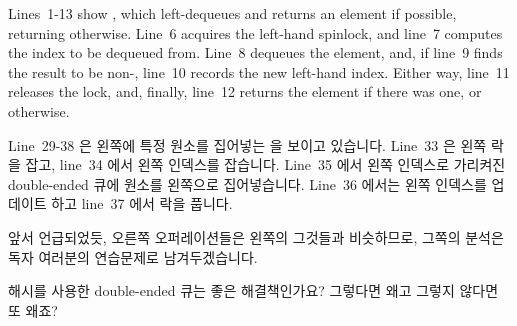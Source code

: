 Lines~1-13 show , which left-dequeues and returns
an element if possible, returning  otherwise.
Line~6 acquires the left-hand spinlock, and line~7 computes the
index to be dequeued from.
Line~8 dequeues the element, and, if line~9 finds the result to be
non-, line~10 records the new left-hand index.
Either way, line~11 releases the lock, and, finally, line~12 returns
the element if there was one, or  otherwise.
\fi

Line~29-38 은 왼쪽에 특정 원소를 집어넣는  을 보이고
있습니다.
Line~33 은 왼쪽 락을 잡고, line~34 에서 왼쪽 인덱스를 잡습니다.
Line~35 에서 왼쪽 인덱스로 가리켜진 double-ended 큐에 원소를 왼쪽으로
집어넣습니다.
Line~36 에서는 왼쪽 인덱스를 업데이트 하고 line~37 에서 락을 풉니다.

앞서 언급되었듯, 오른쪽 오퍼레이션들은 왼쪽의 그것들과 비슷하므로, 그쪽의
분석은 독자 여러분의 연습문제로 남겨두겠습니다.

\QuickQuiz{}
	해시를 사용한 double-ended 큐는 좋은 해결책인가요?
	그렇다면 왜고 그렇지 않다면 또 왜죠?
	\iffalse

